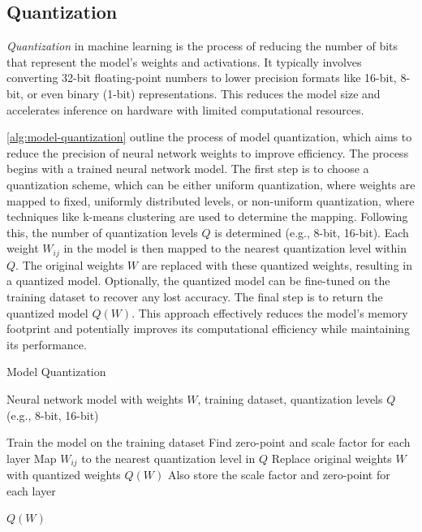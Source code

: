 \documentclass{ioereport}
\begin{document}
    \subsection{Quantization}
    \textit{Quantization} in machine learning is the process of reducing the number of bits that represent the model's weights and activations. It typically involves converting 32-bit floating-point numbers to lower precision formats like 16-bit, 8-bit, or even binary (1-bit) representations. This reduces the model size and accelerates inference on hardware with limited computational resources.

    \autoref{alg:model-quantization} outline the process of model quantization, which aims to reduce the precision of neural network weights to improve efficiency. The process begins with a trained neural network model. The first step is to choose a quantization scheme, which can be either uniform quantization, where weights are mapped to fixed, uniformly distributed levels, or non-uniform quantization, where techniques like k-means clustering are used to determine the mapping. Following this, the number of quantization levels $Q$ is determined (e.g., 8-bit, 16-bit). Each weight $W_{ij}$ in the model is then mapped to the nearest quantization level within $Q$. The original weights $W$ are replaced with these quantized weights, resulting in a quantized model. Optionally, the quantized model can be fine-tuned on the training dataset to recover any lost accuracy. The final step is to return the quantized model $Q(W)$. This approach effectively reduces the model's memory footprint and potentially improves its computational efficiency while maintaining its performance.
    
    \begin{algorithm}[H]
        \caption{Model Quantization}
        \label{alg:model-quantization}
        \begin{algorithmic}[1]
        \REQUIRE Neural network model with weights $W$, training dataset, quantization levels $Q$ (e.g., 8-bit, 16-bit)
        
        \STATE Train the model on the training dataset
        \STATE Find zero-point and scale factor for each layer
            \STATE Map $W_{ij}$ to the nearest quantization level in $Q$
        \ENDFOR
        \STATE Replace original weights $W$ with quantized weights $Q(W)$
        \STATE Also store the scale factor and zero-point for each layer
        
        \RETURN $Q(W)$
        \end{algorithmic}
    \end{algorithm}
        
\end{document}
